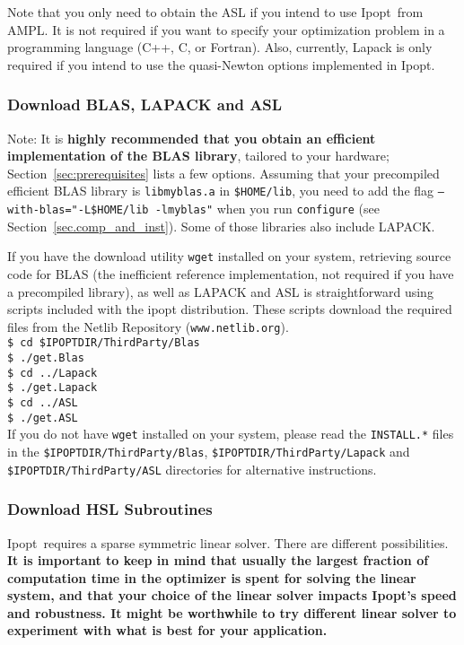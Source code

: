 \documentclass[10pt]{article}
\newcommand{\Ipopt}{{\sc Ipopt}}
\begin{document}
Note that you only need to obtain the ASL if you intend to use \Ipopt\
from AMPL.  It is not required if you want to specify your
optimization problem in a programming language (C++, C, or Fortran).
Also, currently, Lapack is only required if you intend to use the
quasi-Newton options implemented in \Ipopt.

\subsubsection{Download BLAS, LAPACK and ASL}
Note: It is \textbf{highly recommended that you obtain an efficient
  implementation of the BLAS library}, tailored to your hardware;
Section~\ref{sec:prerequisites} lists a few options.  Assuming that
your precompiled efficient BLAS library is \texttt{libmyblas.a} in
\texttt{\$HOME/lib}, you need to add the flag
\texttt{--with-blas="-L\$HOME/lib -lmyblas"} when you run
\texttt{configure} (see Section~\ref{sec.comp_and_inst}).  Some of
those libraries also include LAPACK.

If you have the download utility \texttt{wget} installed on your
system, retrieving source code for BLAS (the inefficient reference
implementation, not required if you have a precompiled library), as
well as LAPACK and ASL is straightforward using scripts included with
the ipopt distribution.  These scripts download the required files
from the Netlib Repository
(\texttt{www.netlib.org}).\\

\noindent
{\tt \$ cd \$IPOPTDIR/ThirdParty/Blas}\\
{\tt \$ ./get.Blas}\\
{\tt \$ cd ../Lapack}\\
{\tt \$ ./get.Lapack}\\
{\tt \$ cd ../ASL}\\
{\tt \$ ./get.ASL}\\

\noindent
If you do not have \texttt{wget} installed on your system, please read
the \texttt{INSTALL.*} files in the
\texttt{\$IPOPTDIR/ThirdParty/Blas},
\texttt{\$IPOPTDIR/ThirdParty/Lapack} and
\texttt{\$IPOPTDIR/ThirdParty/ASL} directories for alternative
instructions.

\subsubsection{Download HSL Subroutines}
\Ipopt\ requires a sparse symmetric linear solver.  There are
different possibilities.  {\bf It is important to keep in mind that usually
the largest fraction of computation time in the optimizer is spent for
solving the linear system, and that your choice of the linear solver
impacts \Ipopt's speed and robustness.  It might be worthwhile to try
different linear solver to experiment with what is best for your
application.}
\end{document}
